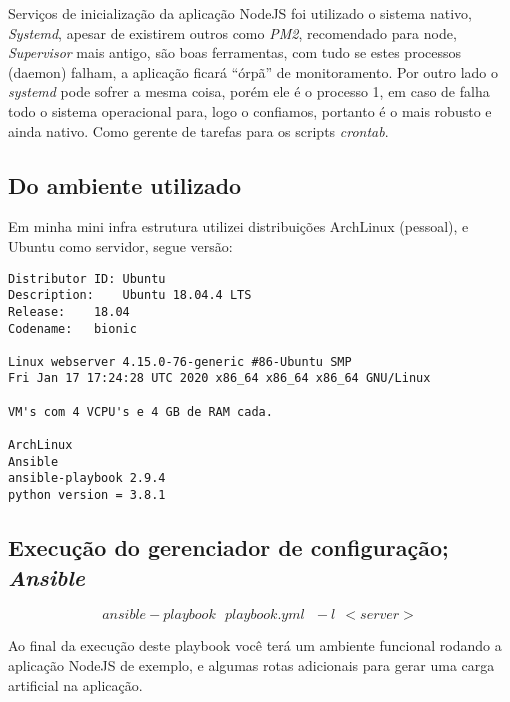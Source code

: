 Serviços de inicialização da aplicação NodeJS foi utilizado o sistema
nativo, \emph{Systemd}, apesar de existirem outros como \emph{PM2},
recomendado para node, \emph{Supervisor} mais antigo, são boas
ferramentas, com tudo se estes processos (daemon) falham, a aplicação ficará
``órpã'' de monitoramento. Por outro lado o \emph{systemd} pode sofrer
a mesma coisa, porém ele é o processo 1, em caso de falha todo o
sistema operacional para, logo o confiamos, portanto é o mais robusto e
ainda nativo. Como gerente de tarefas para os scripts \emph{crontab}.


\subsection{Do ambiente utilizado}
Em minha mini infra estrutura utilizei distribuições ArchLinux (pessoal), e
Ubuntu como servidor, segue versão:

\begin{verbatim}
Distributor ID:	Ubuntu
Description:	Ubuntu 18.04.4 LTS
Release:	18.04
Codename:	bionic

Linux webserver 4.15.0-76-generic #86-Ubuntu SMP
Fri Jan 17 17:24:28 UTC 2020 x86_64 x86_64 x86_64 GNU/Linux

VM's com 4 VCPU's e 4 GB de RAM cada.

ArchLinux
Ansible
ansible-playbook 2.9.4
python version = 3.8.1
\end{verbatim}


\subsection{Execução do gerenciador de configuração; \emph{Ansible}} \label{sec:playbook}
$$ansible-playbook\ \ \ playbook.yml\ \ \ -l\ \ <server>$$

Ao final da execução deste playbook você terá um ambiente funcional
rodando a aplicação NodeJS de exemplo, e algumas rotas adicionais para
gerar uma carga artificial na aplicação.



